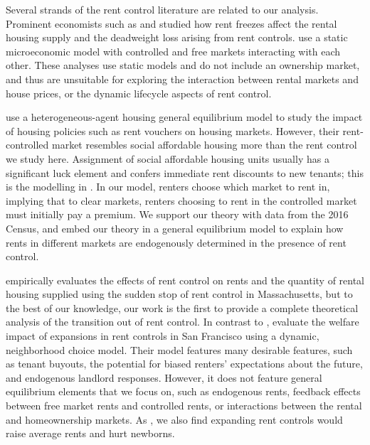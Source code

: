 \documentclass[parskip=full]{article}
\begin{document}
Several strands of the rent control literature are related to our analysis. Prominent economists such as \citet{hayek-1929} and \citet{fs-1946} studied how rent freezes affect the rental housing supply and the deadweight loss arising from rent controls. \citet{fallis-1985} use a static microeconomic model with controlled and free markets interacting with each other. These analyses use static models and do not include an ownership market, and thus are unsuitable for exploring the interaction between rental markets and house prices, or the dynamic lifecycle aspects of rent control.

\citet{fmn-2022} use a heterogeneous-agent housing general equilibrium model to study the impact of housing policies such as rent vouchers on housing markets. However, their rent-controlled market resembles social affordable housing more than the rent control we study here. Assignment of social affordable housing units usually has a significant luck element and confers immediate rent discounts to new tenants; this is the modelling in \citet{fmn-2022}. In our model, renters choose which market to rent in, implying that to clear markets, renters choosing to rent in the controlled market must initially pay a premium. We support our theory with data from the 2016 Census, and embed our theory in a general equilibrium model to explain how rents in different markets are endogenously determined in the presence of rent control.

\citet{sims-2007} empirically evaluates the effects of rent control on rents and the quantity of rental housing supplied using the sudden stop of rent control in Massachusetts, but to the best of our knowledge, our work is the first to provide a complete theoretical analysis of the transition out of rent control. In contrast to \citet{sims-2007}, \citet{diamond-2019} evaluate the welfare impact of expansions in rent controls in San Francisco using a dynamic, neighborhood choice model. Their model features many desirable features, such as tenant buyouts, the potential for biased renters' expectations about the future, and endogenous landlord responses. However, it does not feature general equilibrium elements that we focus on, such as endogenous rents, feedback effects between free market rents and controlled rents, or interactions between the rental and homeownership markets. As \citet{diamond-2019}, we also find expanding rent controls would raise average rents and hurt newborns.
\end{document}
